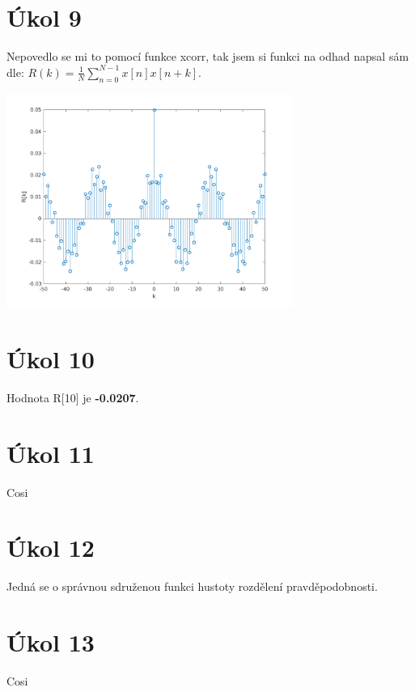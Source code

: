 \documentclass[a4paper, titlepage, final, 10pt]{article}
\begin{document}
\section{Úkol 9}
	Nepovedlo se mi to pomocí funkce xcorr, tak jsem si funkci na odhad napsal sám dle:
	\( {R}(k) = \frac{1}{N} \sum_{n=0}^{N-1} x[n]x[n+k] \).

	{\centering \includegraphics[width=\textwidth, height=7cm]{Final/task9.png} \par}
\section{Úkol 10}
	Hodnota R[10] je \textbf{-0.0207}.
\section{Úkol 11}
	Cosi
\section{Úkol 12}
	Jedná se o správnou sdruženou funkci hustoty rozdělení pravděpodobnosti.
\section{Úkol 13}
	Cosi
\end{document}
